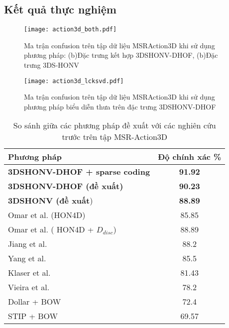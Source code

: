 	
\subsection{Kết quả thực nghiệm}
\begin{figure}
\centering
\texttt{[image: action3d\_both.pdf]}
\caption{Ma trận confusion trên tập dữ liệu MSRAction3D khi sử dụng phương pháp: (b)Đặc trưng kết hợp 3DSHONV-DHOF, (b)Đặc trưng 3DS-HONV}
\label{fig_action3d_both_conf}
\end{figure}	

\begin{figure}
\centering
\texttt{[image: action3d\_lcksvd.pdf]}
\caption{Ma trận confusion trên tập dữ liệu MSRAction3D khi sử dụng phương pháp biểu diễn thưa trên đặc trưng 3DSHONV-DHOF}
\label{fig_action3d_sparse_conf}
\end{figure}	

\begin{table}
	\caption{So sánh giữa các phương pháp đề xuất với các nghiên cứu trước trên tập MSR-Action3D}
	\centering 
	\begin{tabular}{l c}	
	\hline\hline
	\textbf{Phương pháp} & \textbf{Độ chính xác \%} \\	
	\hline\hline
	\textbf{3DSHONV-DHOF + sparse coding} & \textbf{91.92}\\ 
	\textbf{3DSHONV-DHOF (đề xuất)} &  \textbf{90.23}\\ 
	\textbf{3DSHONV (đề xuất}) & \textbf{88.89}\\
	\hline \hline
	Omar et al. \cite{Omar_HON4D} (HON4D) & 85.85\\
	Omar et al. \cite{Omar_HON4D} (	HON4D + \(D_{disc}\))	& 88.89\\
	Jiang et al. \cite{Wu_LOP2012} & 88.2 \\
	Yang et al. \cite{WangLCCW12_ROP} & 85.5 \\
	Klaser et al. \cite{Klaser_HOG3D} & 81.43 \\
	Vieira et al. \cite{VieiraNOLC12_STOP} & 78.2 \\
	Dollar\cite{DollarVSPETS05cuboids} + BOW  & 72.4 \\
	STIP\cite{LMSR08} + BOW & 69.57 \\
	\hline
	\end{tabular}	
	\label{table_action3d}
\end{table}

